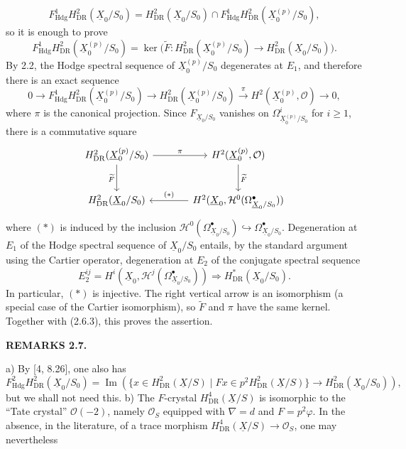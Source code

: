 \documentclass[10pt]{article}
\newcommand{\UX}{\underline{X}}
\begin{document}
\[
F^1_{\mathrm{Hdg}}H^2_{\mathrm{DR}}(\UX_0/S_0)=
H^2_{\mathrm{DR}}(\UX_0/S_0)\cap F^1_{\mathrm{Hdg}}H^2_{\mathrm{DR}}(\UX_0^{(p)}/S_0),
\]
so it is enough to prove
\begin{equation}\tag{2.6.2}
F^1_{\mathrm{Hdg}}H^2_{\mathrm{DR}}(\UX_0^{(p)}/S_0)
=\ker\bigl(\widetilde F:H^2_{\mathrm{DR}}(\UX_0^{(p)}/S_0)\to H^2_{\mathrm{DR}}(\UX_0/S_0)\bigr).
\end{equation}
By 2.2, the Hodge spectral sequence of $\UX_0^{(p)}/S_0$ degenerates at $E_1$, and therefore there is an exact sequence
\begin{equation}\tag{2.6.3}
0\longrightarrow F^1_{\mathrm{Hdg}}H^2_{\mathrm{DR}}(\UX_0^{(p)}/S_0)
\longrightarrow H^2_{\mathrm{DR}}(\UX_0^{(p)}/S_0)
\xrightarrow{\pi}H^2(\UX_0^{(p)},\mathcal O)\longrightarrow0,
\end{equation}
where $\pi$ is the canonical projection. Since $F_{\UX_0/S_0}$ vanishes on $\Omega^i_{\UX_0^{(p)}/S_0}$ for $i\ge1$, there is a commutative square
\[
\begin{tikzcd}[column sep=large,row sep=large]
H^2_{\mathrm{DR}}(\UX_0^{(p)}/S_0)\arrow[r,"\pi"]\arrow[d,"\widetilde F"']&H^2(\UX_0^{(p)},\mathcal O)\arrow[d,"\widetilde F"]\\
H^2_{\mathrm{DR}}(\UX_0/S_0)&H^2(\UX_0,\mathcal H^0(\Omega^\bullet_{\UX_0/S_0}))\arrow[l,"(*)"']
\end{tikzcd}
\]
where $(*)$ is induced by the inclusion $\mathcal H^0(\Omega^\bullet_{\UX_0/S_0})\hookrightarrow\Omega^\bullet_{\UX_0/S_0}$. Degeneration at $E_1$ of the Hodge spectral sequence of $\UX_0/S_0$ entails, by the standard argument using the Cartier operator, degeneration at $E_2$ of the conjugate spectral sequence
\[
E_2^{ij}=H^i(\UX_0,\mathcal H^j(\Omega^\bullet_{\UX_0/S_0}))\Longrightarrow H^*_{\mathrm{DR}}(\UX_0/S_0).
\]
In particular, $(*)$ is injective. The right vertical arrow is an isomorphism (a special case of the Cartier isomorphism), so $\widetilde F$ and $\pi$ have the same kernel. Together with (2.6.3), this proves the assertion.

\noindent\textbf{REMARKS 2.7.}

\noindent a) By [4, 8.26], one also has
\begin{equation}\tag{2.7.1}
F^2_{\mathrm{Hdg}}H^2_{\mathrm{DR}}(\UX_0/S_0)
=\operatorname{Im}\!\left(
\{x\in H^2_{\mathrm{DR}}(\UX/S)\mid Fx\in p^2H^2_{\mathrm{DR}}(\UX/S)\}
\longrightarrow H^2_{\mathrm{DR}}(\UX_0/S_0)\right),
\end{equation}
but we shall not need this.
\noindent b) The $F$-crystal $H^4_{\mathrm{DR}}(\UX/S)$ is isomorphic to the ``Tate crystal'' $\mathcal O(-2)$, namely $\mathcal O_S$ equipped with $\nabla=d$ and $F=p^2\varphi$. In the absence, in the literature, of a trace morphism $H^4_{\mathrm{DR}}(\UX/S)\to\mathcal O_S$, one may nevertheless
\newpage
\setcounter{footnote}{0}
\fontsize{10.2pt}{12.04pt}\selectfont
\end{document}
